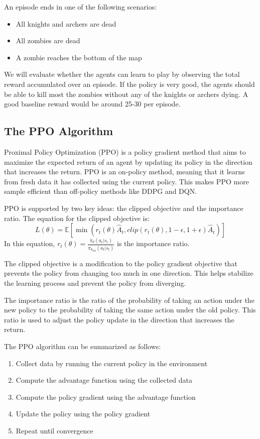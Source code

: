 \documentclass{article}
\begin{document}
An episode ends in one of the following scenarios:
\begin{itemize}
  \item All knights and archers are dead
  \item All zombies are dead
  \item A zombie reaches the bottom of the map
\end{itemize}

We will evaluate whether the agents can learn to play by observing the total reward accumulated over an episode. If the policy is very good, 
the agents should be able to kill most the zombies without any of the knights or archers dying. A good baseline reward would be around 25-30 per episode.

\subsection{The PPO Algorithm}
\label{sec:subheadings}
Proximal Policy Optimization (PPO) is a policy gradient method that aims to maximize the expected return
of an agent by updating its policy in the direction that increases the return. PPO is an on-policy method,
meaning that it learns from fresh data it has collected using the current policy. This makes PPO more sample efficient
than off-policy methods like DDPG and DQN. 

PPO is supported by two key ideas: the clipped objective and the importance ratio. The equation for the clipped objective is:
\begin{equation}
  L(\theta) = \mathbb{E} \left[ \min \left( r_t(\theta) \hat{A}_t, clip(r_t(\theta), 1 - \epsilon, 1 + \epsilon) \hat{A}_t \right) \right]
\end{equation}
In this equation, $\displaystyle r_t(\theta) = \frac{\pi_{\theta}(a_t|s_t)}{\pi_{\theta_{old}}(a_t|s_t)}$ is the importance ratio.

The clipped objective
is a modification to the policy gradient objective that prevents the policy from changing too much in one
direction. This helps stabilize the learning process and prevent the policy from diverging.

The importance ratio
is the ratio of the probability of taking an action under the new policy to the probability of taking the same
action under the old policy. This ratio is used to adjust the policy update in the direction that increases the return.

The PPO algorithm can be summarized as follows:
\begin{enumerate}
  \item Collect data by running the current policy in the environment
  \item Compute the advantage function using the collected data
  \item Compute the policy gradient using the advantage function
  \item Update the policy using the policy gradient
  \item Repeat until convergence
\end{enumerate}
\end{document}
